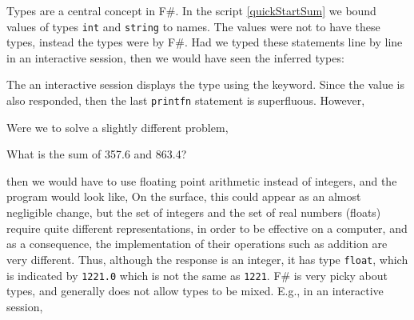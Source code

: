 Types are a central concept in F\#. In the script \ref{quickStartSum} we bound values of types \lstinline|int| and \lstinline|string| to names. The values were not  to have these types, instead the types were  by F\#. Had we typed these statements line by line in an interactive session, then we would have seen the inferred types:
%
\begin{comment}
$ fsharpi

F# Interactive for F# 4.0 (Open Source Edition)
Freely distributed under the Apache 2.0 Open Source License

For help type #help;;

\end{comment}
%
%
\begin{comment}
  $
\end{comment}
%
%






%
%
\begin{comment}

> #quit;;
\end{comment}
%
The an interactive session displays the type using the  keyword. Since the value is also responded, then the last \lstinline|printfn| statement is superfluous. However, 

Were we to solve a slightly different problem,
%
\begin{problem}
  What is the sum of 357.6 and 863.4?
\end{problem}
%
then we would have to use floating point arithmetic instead of integers, and the program would look like,
%
%
On the surface, this could appear as an almost negligible change, but the set of integers and the set of real numbers (floats) require quite different representations, in order to be effective on a computer, and as a consequence, the implementation of their operations such as addition are very different. Thus, although the response is an integer, it has type \lstinline|float|, which is indicated by \lstinline|1221.0| which is not the same as \lstinline|1221|. F\# is very picky about types, and generally does not allow types to be mixed. E.g., in an interactive session,
%

